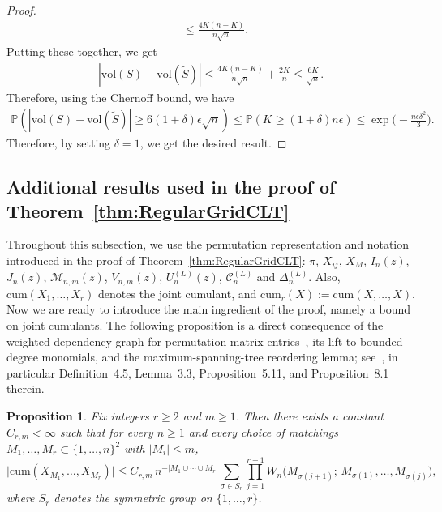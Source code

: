 \documentclass[11pt]{article}
\newtheorem{prop}[thm]{Proposition}
\newcommand{\vol}{\mathrm{vol}}
\newcommand{\abs}[1]{| #1|}
\begin{document}
\begin{proof}
\begin{align*}
        &\leq \frac{4K(n - K)}{n\sqrt{n}}. 
    \end{align*}
    Putting these together, we get 
    \begin{align*}
        \abs{\vol(S) - \vol(\tilde{S})} \leq \frac{4K(n - K)}{n\sqrt{n}} + \frac{2K}{n} \leq \frac{6K}{\sqrt{n}}.
    \end{align*} 
    Therefore, using the Chernoff bound, we have
    \begin{align*}
        \mathbb{P}(\abs{\vol(S) - \vol(\tilde{S})} \geq 6(1 + \delta)\epsilon\sqrt{n}) \leq \mathbb{P}(K\geq (1 + \delta)n\epsilon) \leq \exp\big(-\frac{n\epsilon\delta^2}{3}\big).
    \end{align*}
    Therefore, by setting $\delta = 1$, we get the desired result.
\end{proof}


\subsection{Additional results used in the proof of Theorem~\ref{thm:RegularGridCLT}}

Throughout this subsection, we use the permutation representation and notation introduced in the proof of Theorem~\ref{thm:RegularGridCLT}: $\pi$, $X_{ij}$, $X_M$, $I_n(z)$, $J_n(z)$, $\mathcal M_{n,m}(z)$, $V_{n,m}(z)$, $U_n^{(L)}(z)$, $\mathscr C_n^{(L)}$ and $\Delta_n^{(L)}$. Also, $\mathrm{cum}(X_1,\ldots,X_r)$ denotes the joint cumulant, and $\mathrm{cum}_r(X):=\mathrm{cum}(X,\ldots,X)$. Now we are ready to introduce the main ingredient of the proof, namely a bound on joint cumulants. The following proposition is a direct consequence of the weighted dependency graph
for permutation-matrix entries~\citep{Feray2018WeightedDG}, its lift to bounded-degree monomials, and the
maximum-spanning-tree reordering lemma; see~\citet{Feray2018WeightedDG}, in particular
Definition~4.5, Lemma~3.3, Proposition~5.11, and Proposition~8.1 therein.  


\begin{prop}\label{prop:imported}
Fix integers $r\ge2$ and $m\ge1$. Then there exists a constant $C_{r,m}<\infty$
such that for every $n\ge1$ and every choice of matchings
$M_1,\dots,M_r\subset\{1,\dots,n\}^2$ with $|M_i|\le m$,
\begin{equation}\label{eq:imported}
\bigl|\mathrm{cum}(X_{M_1},\dots,X_{M_r})\bigr|
\le
C_{r,m}\,
n^{-\abs{M_1\cup\cdots\cup M_r}}
\sum_{\sigma\in S_r}
\prod_{j=1}^{r-1}
W_n\bigl(M_{\sigma(j+1)};\,M_{\sigma(1)},\dots,M_{\sigma(j)}\bigr),
\end{equation}
where $S_r$ denotes the symmetric group on $\{1,\dots,r\}$.
\end{prop}
\end{document}
